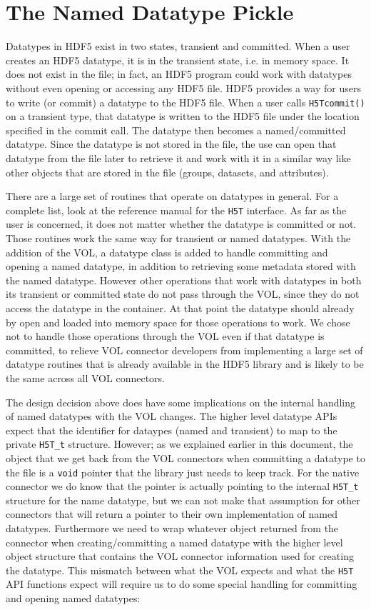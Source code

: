 \section{The Named Datatype Pickle}
Datatypes in HDF5 exist in two states, transient and committed. When a user creates an HDF5 datatype, it is in the transient state, i.e. in memory space. It does not exist in the file; in fact, an HDF5 program could work with datatypes without even opening or accessing any HDF5 file. HDF5 provides a way for users to write (or commit) a datatype to the HDF5 file. When a user calls {\tt H5Tcommit()} on a transient type, that datatype is written to the HDF5 file under the location specified in the commit call. The datatype then becomes a named/committed datatype. Since the datatype is not stored in the file, the use can open that datatype from the file later to retrieve it and work with it in a similar way like other objects that are stored in the file (groups, datasets, and attributes).

There are a large set of routines that operate on datatypes in general. For a complete list, look at the reference manual for the {\tt H5T} interface. As far as the user is concerned, it does not matter whether the datatype is committed or not. Those routines work the same way for transient or named datatypes. With the addition of the VOL, a datatype class is added to handle committing and opening a named datatype, in addition to retrieving some metadata stored with the named datatype. However other operations that work with datatypes in both its transient or committed state do not pass through the VOL, since they do not access the datatype in the container. At that point the datatype should already by open and loaded into memory space for those operations to work. We chose not to handle those operations through the VOL even if that datatype is committed, to relieve VOL connector developers from implementing a large set of datatype routines that is already available in the HDF5 library and is likely to be the same across all VOL connectors.

The design decision above does have some implications on the internal handling of named datatypes with the VOL changes. The higher level datatype APIs expect that the identifier for dataypes (named and transient) to map to the private {\tt H5T\_t} structure. However; as we explained earlier in this document, the object that we get back from the VOL connectors when committing a datatype to the file is a {\tt void} pointer that the library just needs to keep track. For the native connector we do know that the pointer is actually pointing to the internal {\tt H5T\_t} structure for the name datatype, but we can not make that assumption for other connectors that will return a pointer to their own implementation of named datatypes. Furthermore we need to wrap whatever object returned from the connector when creating/committing a named datatype with the higher level object structure that contains the VOL connector information used for creating the datatype. This mismatch between what the VOL expects and what the {\tt H5T} API functions expect will require us to do some special handling for committing and opening named datatypes:

